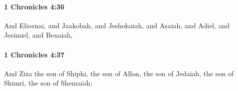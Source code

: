 		\paragraph{1 Chronicles 4:36} %
			\label{1CHRONICLES-4-36}

			And Elioenai, and Jaakobah, and Jeshohaiah, and Asaiah, and Adiel, and Jesimiel, and Benaiah,


		\paragraph{1 Chronicles 4:37} %
			\label{1CHRONICLES-4-37}

			And Ziza the son of Shiphi, the son of Allon, the son of Jedaiah, the son of Shimri, the son of Shemaiah;


